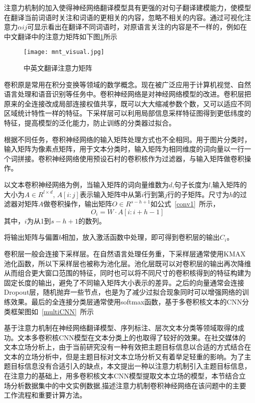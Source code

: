 注意力机制的加入使得神经网络翻译模型具有更强的对句子翻译建模能力，使模型在翻译当前词语时关注和词语的更相关的内容，忽略不相关的内容。通过可视化注意力$\alpha{ij}$可显示看出在翻译不同词语时，对原语言关注的内容是不一样的，例如在中文翻译中的注意力矩阵如下图\ref{english2china}所示
\begin{figure}[htbp]
	\centering
	\texttt{[image: mnt\_visual.jpg]}
	\caption[english2china1]{中英文翻译注意力矩阵}
	\label{english2china}
\end{figure}


卷积原是常用在积分变换等领域的数学概念。现在被广泛应用于计算机视觉、自然语言处理和语音识别等任务中。卷积神经网络是对神经网络模型的改进。卷积层把原来的全连接改成局部连接权值共享，既可以大大缩减参数个数，又可以适应不同区域统计特性一样的特征。下采样层可以利用局部信息采样特征图得到更低纬度的特征，提高模型的泛化能力，防止训练的分类器过拟合。

根据不同任务，卷积神经网络的输入矩阵处理方式也不全相同。用于图片分类时，输入矩阵为像素点矩阵，用于文本分类时，输入矩阵为相同维度的词向量以一行一个词拼接。卷积神经网络使用预设石村的卷积核作为过滤器，与输入矩阵做卷积操作。

以文本卷积神经网络为例，当输入矩阵的词向量维数为$d$,句子长度为$l$,输入矩阵的大小为$A\in R^{l\times d}$, $A[i:j]$表示输入矩阵中从第$i$行到第$j$行的子矩阵。尺寸为$h$的过滤器对矩阵$A$做卷积操作，输出矩阵$O\in R^{s-h+1}$如公式~\ref{conv1}~所示，
\begin{equation}\label{conv1}
O_i=W\cdot A[i:i+h-1]
\end{equation}
其中，$i$为从1到$s-h+1$的数列。

将输出矩阵与偏置$b$相加，放入激活函数中处理，即可得到卷积层的输出$C_i$。

卷积层一般会连接下采样层。在自然语言处理任务重，下采样层通常使用KMAX池化函数，所以下采样层也被称为池化层。池化层既可以对卷积层的输出再次降维从而组合更大窗口范围的特征，同时也可以将不同尺寸的卷积核得到的特征构建为固定长度的输出，避免了不同输入矩阵大小表示的差异。之后的向量通常会连接Dropout层，随机抛弃一些节点，也是为了减少过拟合现象同时可以增强网络的训练效果。最后的全连接分类层通常使用softmax函数，基于多卷积核文本的CNN分类框架图如~\ref{multiCNN}~所示

基于注意力机制在神经网络翻译模型、序列标注、层次文本分类等领域取得的成功。文本多卷积核CNN模型在文本分类上的也取得了较好的效果。在社交媒体的文本立场分析上，由于当前研究没有一种有效把主题目标信息以合适的方式结合在文本的立场分析中，但是主题目标对文本立场分析又有着举足轻重的影响。为了主题目标信息没有合适引入的缺点，本文提出一种以注意力机制引入主题目标信息，在注意力的基础上，用多卷积核文本CNN模型提取文本立场的模型，本节结合立场分析数据集中的中文实例数据,描述注意力机制卷积神经网络在该问题中的主要工作流程和重要计算方法。

